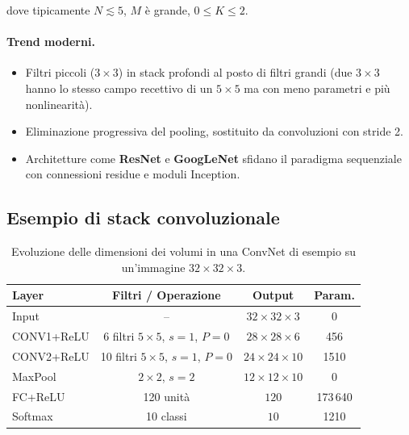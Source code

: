 dove tipicamente $N \lesssim 5$, $M$ è grande, $0 \le K \le 2$.

\paragraph{Trend moderni.}
\begin{itemize}
  \item Filtri piccoli ($3 \times 3$) in stack profondi al posto di filtri grandi (due
        $3\times3$ hanno lo stesso campo recettivo di un $5\times5$ ma con meno parametri e
        più nonlinearità).
  \item Eliminazione progressiva del pooling, sostituito da convoluzioni con stride 2.
  \item Architetture come \textbf{ResNet} e \textbf{GoogLeNet} sfidano il paradigma
        sequenziale con connessioni residue e moduli Inception.
\end{itemize}

\subsection{Esempio di stack convoluzionale}
\label{subsec:conv-stack-example}

\begin{table}[H]
  \centering
  \caption{Evoluzione delle dimensioni dei volumi in una ConvNet di esempio su
           un'immagine $32\times32\times3$.}
  \label{tab:conv-stack}
  \small
  \begin{tabular}{lccc}
    \toprule
    \textbf{Layer} & \textbf{Filtri / Operazione} & \textbf{Output} & \textbf{Param.} \\
    \midrule
    Input          & --                                       & $32\times32\times3$  & 0 \\
    CONV1+ReLU     & 6 filtri $5\times5$, $s=1$, $P=0$       & $28\times28\times6$  & 456 \\
    CONV2+ReLU     & 10 filtri $5\times5$, $s=1$, $P=0$      & $24\times24\times10$ & 1510 \\
    MaxPool        & $2\times2$, $s=2$                        & $12\times12\times10$ & 0 \\
    FC+ReLU        & 120 unità                                & $120$                & 173\,640 \\
    Softmax        & 10 classi                                & $10$                 & 1210 \\
    \bottomrule
  \end{tabular}
\end{table}

